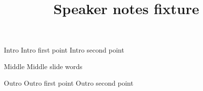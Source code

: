 \documentclass{beamer}
\title{Speaker notes fixture}
\begin{document}
\begin{frame}{Intro}
  Intro first point \pause Intro second point
\end{frame}
\begin{frame}[label=middle]{Middle}
  Middle slide words
\end{frame}
\begin{frame}{Outro}
  Outro first point \pause Outro second point
\end{frame}
\end{document}
